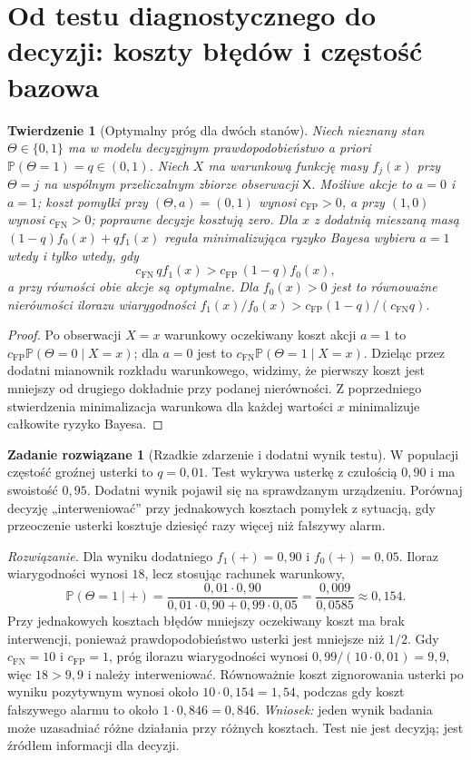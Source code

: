\documentclass[11pt,a4paper,oneside]{report}
\numberwithin{equation}{chapter}
\theoremstyle{plain}
\newtheorem{twierdzenie}{Twierdzenie}[chapter]
\theoremstyle{definition}
\newtheorem{zadanie}{Zadanie rozwiązane}[chapter]
\theoremstyle{remark}
\newcommand{\Prob}{\mathbb P}
\begin{document}
\section{Od testu diagnostycznego do decyzji: koszty błędów i częstość bazowa}
\begin{twierdzenie}[Optymalny próg dla dwóch stanów]\label{thm:decision-lr}
Niech nieznany stan $\Theta\in\{0,1\}$ ma w modelu decyzyjnym
prawdopodobieństwo a priori $\Prob(\Theta=1)=q\in(0,1)$.
Niech $X$ ma warunkową funkcję masy $f_j(x)$ przy $\Theta=j$
na wspólnym przeliczalnym zbiorze obserwacji $\mathsf X$.
Możliwe akcje to $a=0$ i $a=1$; koszt pomyłki przy
$(\Theta,a)=(0,1)$ wynosi $c_{\mathrm{FP}}>0$, a przy $(1,0)$
wynosi $c_{\mathrm{FN}}>0$; poprawne decyzje kosztują zero.
Dla $x$ z dodatnią mieszaną masą
$(1-q)f_0(x)+qf_1(x)$ reguła minimalizująca ryzyko Bayesa
wybiera $a=1$ wtedy i tylko wtedy, gdy
\[
 c_{\mathrm{FN}}\,q f_1(x)
>c_{\mathrm{FP}}\,(1-q) f_0(x),
\]
a przy równości obie akcje są optymalne. Dla $f_0(x)>0$ jest to
równoważne nierówności ilorazu wiarygodności
$f_1(x)/f_0(x)>c_{\mathrm{FP}}(1-q)/(c_{\mathrm{FN}}q)$.
\end{twierdzenie}
\begin{proof}
Po obserwacji $X=x$ warunkowy oczekiwany koszt akcji $a=1$ to
$c_{\mathrm{FP}}\Prob(\Theta=0\mid X=x)$; dla $a=0$ jest to
$c_{\mathrm{FN}}\Prob(\Theta=1\mid X=x)$.
Dzieląc przez dodatni mianownik rozkładu warunkowego, widzimy, że
pierwszy koszt jest mniejszy od drugiego dokładnie przy podanej
nierówności. Z poprzedniego stwierdzenia minimalizacja warunkowa dla
każdej wartości $x$ minimalizuje całkowite ryzyko Bayesa.
\end{proof}

\begin{zadanie}[Rzadkie zdarzenie i dodatni wynik testu]\label{zad:rare-classification}
W populacji częstość groźnej usterki to $q=0{,}01$.
Test wykrywa usterkę z czułością $0{,}90$ i ma swoistość $0{,}95$.
Dodatni wynik pojawił się na sprawdzanym urządzeniu. Porównaj decyzję
„interweniować” przy jednakowych kosztach pomyłek z sytuacją,
gdy przeoczenie usterki kosztuje dziesięć razy więcej niż fałszywy alarm.
\par\emph{Rozwiązanie.}
Dla wyniku dodatniego $f_1(+)=0{,}90$ i $f_0(+)=0{,}05$.
Iloraz wiarygodności wynosi $18$, lecz stosując rachunek warunkowy,
\[
\Prob(\Theta=1\mid +)
=\frac{0{,}01\cdot0{,}90}
 {0{,}01\cdot0{,}90+0{,}99\cdot0{,}05}
=\frac{0{,}009}{0{,}0585}\approx0{,}154.
\]
Przy jednakowych kosztach błędów mniejszy oczekiwany koszt ma
brak interwencji, ponieważ prawdopodobieństwo usterki jest mniejsze niż
$1/2$. Gdy $c_{\mathrm{FN}}=10$ i $c_{\mathrm{FP}}=1$,
próg ilorazu wiarygodności wynosi
$0{,}99/(10\cdot0{,}01)=9{,}9$, więc $18>9{,}9$ i należy
interweniować. Równoważnie koszt zignorowania usterki po wyniku
pozytywnym wynosi około $10\cdot0{,}154=1{,}54$, podczas gdy koszt
fałszywego alarmu to około $1\cdot0{,}846=0{,}846$.
\emph{Wniosek:} jeden wynik badania może uzasadniać różne działania przy
różnych kosztach. Test nie jest decyzją; jest źródłem informacji dla decyzji.
\end{zadanie}
\end{document}
